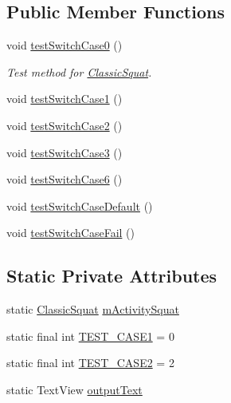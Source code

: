 \subsection*{Public Member Functions}
\begin{DoxyCompactItemize}
\item 
void \mbox{\hyperlink{classcom_1_1example_1_1trainawearapplication_1_1_classic_squat_switch_test_adca8046d4e95d7ca68bbc42ad0cf5d49}{test\+Switch\+Case0}} ()
\begin{DoxyCompactList}\small\item\em Test method for \mbox{\hyperlink{classcom_1_1example_1_1trainawearapplication_1_1_classic_squat}{Classic\+Squat}}. \end{DoxyCompactList}\item 
void \mbox{\hyperlink{classcom_1_1example_1_1trainawearapplication_1_1_classic_squat_switch_test_a8921734ff16a8ee1db468bbe571aaeef}{test\+Switch\+Case1}} ()
\item 
void \mbox{\hyperlink{classcom_1_1example_1_1trainawearapplication_1_1_classic_squat_switch_test_a14b7eb13809009e9175946b1bdcf3d46}{test\+Switch\+Case2}} ()
\item 
void \mbox{\hyperlink{classcom_1_1example_1_1trainawearapplication_1_1_classic_squat_switch_test_a2823f330df1b584569d8ab4b90e9634e}{test\+Switch\+Case3}} ()
\item 
void \mbox{\hyperlink{classcom_1_1example_1_1trainawearapplication_1_1_classic_squat_switch_test_a674df333a8d1b14d893d921e1e3be281}{test\+Switch\+Case6}} ()
\item 
void \mbox{\hyperlink{classcom_1_1example_1_1trainawearapplication_1_1_classic_squat_switch_test_af3378ca920eb59a2c102f85e3627084c}{test\+Switch\+Case\+Default}} ()
\item 
void \mbox{\hyperlink{classcom_1_1example_1_1trainawearapplication_1_1_classic_squat_switch_test_aade7e343e9d5050a6ce3142f756650e9}{test\+Switch\+Case\+Fail}} ()
\end{DoxyCompactItemize}
\subsection*{Static Private Attributes}
\begin{DoxyCompactItemize}
\item 
static \mbox{\hyperlink{classcom_1_1example_1_1trainawearapplication_1_1_classic_squat}{Classic\+Squat}} \mbox{\hyperlink{classcom_1_1example_1_1trainawearapplication_1_1_classic_squat_switch_test_a7a9e3a214af971f6f33cffabd8297902}{m\+Activity\+Squat}}
\item 
static final int \mbox{\hyperlink{classcom_1_1example_1_1trainawearapplication_1_1_classic_squat_switch_test_ad7aca3b01b79d4797ff05766d3e15059}{T\+E\+S\+T\+\_\+\+C\+A\+S\+E1}} = 0
\item 
static final int \mbox{\hyperlink{classcom_1_1example_1_1trainawearapplication_1_1_classic_squat_switch_test_adfafc37af9e307475f809327d404008d}{T\+E\+S\+T\+\_\+\+C\+A\+S\+E2}} = 2
\item 
static Text\+View \mbox{\hyperlink{classcom_1_1example_1_1trainawearapplication_1_1_classic_squat_switch_test_a5942ceb5c90ba3b912bb91020e3989ee}{output\+Text}}
\end{DoxyCompactItemize}


